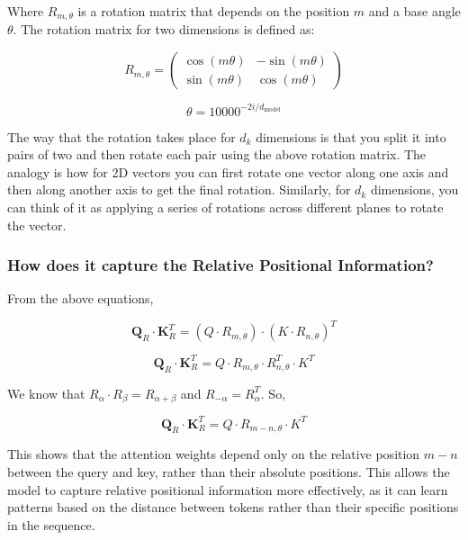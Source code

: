 \documentclass[10pt]{article}
\theoremstyle{plain}
\begin{document}
Where \(R_{m, \theta}\) is a rotation matrix that depends on the position \(m\) and a base angle \(\theta\). The rotation matrix for two dimensions is defined as:

\[
    R_{m, \theta} = \begin{pmatrix}
\cos(m \theta) & -\sin(m \theta) \\
\sin(m \theta) & \cos (m \theta)
\end{pmatrix}
\]

\[
    \theta = 10000^{-2i/d_{\text{model}}}
\]

The way that the rotation takes place for \(d_{k}\) dimensions is that you split it into pairs of two and then rotate each pair using the above rotation matrix. The analogy is how for 2D vectors you can first rotate one vector along one axis and then along another axis to get the final rotation. Similarly, for \(d_k\) dimensions, you can think of it as applying a series of rotations across different planes to rotate the vector.

\subsubsection{How does it capture the Relative Positional Information?}

From the above equations, 

\[
    \mathbf{Q}_{R}  \cdot \mathbf{K}_{R}^T = (Q \cdot R_{m, \theta}) \cdot (K \cdot R_{n, \theta})^T 
\]

\[
    \mathbf{Q}_{R}  \cdot \mathbf{K}_{R}^T = Q \cdot R_{m, \theta} \cdot R_{n, \theta}^T \cdot K^T
\]

We know that \(R_\alpha \cdot R_\beta = R_{\alpha + \beta}\) and \(R_{-\alpha} = R_\alpha^T\). So,

\[
    \mathbf{Q}_{R}  \cdot \mathbf{K}_{R}^T = Q \cdot \boxed{R_{m-n, \theta}} \cdot K^T
\]

This shows that the attention weights depend only on the relative position \(m-n\) between the query and key, rather than their absolute positions. This allows the model to capture relative positional information more effectively, as it can learn patterns based on the distance between tokens rather than their specific positions in the sequence.
\end{document}
